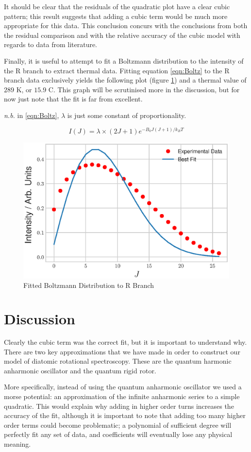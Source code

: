 \documentclass[aps,prl,reprint,10pt,amsmath,amssymb,superscriptaddress,a4paper]{revtex4-2}
\begin{document}
It should be clear that the residuals of the quadratic plot have a clear cubic pattern; this result suggests that adding a cubic term would be much more appropriate for this data. This conclusion concurs with the conclusions from both the residual comparison and with the relative accuracy of the cubic model with regards to data from literature.

Finally, it is useful to attempt to fit a Boltzmann distribution to the intensity of the R branch to extract thermal data. Fitting equation \ref{eqn:Boltz} to the R branch data exclusively yields the following plot (figure \ref{fig:Thermals}) and a thermal value of $289$ K, or $15.9$ C. This graph will be scrutinised more in the discussion, but for now just note that the fit is far from excellent.

{\it n.b.} in \ref{eqn:Boltz}, $\lambda$ is just some constant of proportionality.

\begin{equation}
I \left( J \right) = \lambda \times \left( 2J + 1 \right) e^{ - B_0 J \left( J + 1 \right) /k_B T}
\label{eqn:Boltz}
\end{equation}

\begin{figure} [h]
\includegraphics[width = 8 cm]{Thermal.eps}
\caption{Fitted Boltzmann Distribution to R Branch}
\label{fig:Thermals}
\end{figure}

\section{Discussion}

Clearly the cubic term was the correct fit, but it is important to understand why. There are two key approximations that we have made in order to construct our model of diatomic rotational spectroscopy. These are the quantum harmonic anharmonic oscillator and the quantum rigid rotor. 

More specifically, instead of using the quantum anharmonic oscillator we used a morse potential: an approximation of the infinite anharmonic series to a simple quadratic. This would explain why adding in higher order turns increases the accuracy of the fit, although it is important to note that adding too many higher order terms could become problematic; a polynomial of sufficient degree will perfectly fit any set of data, and coefficients will eventually lose any physical meaning.
\end{document}
